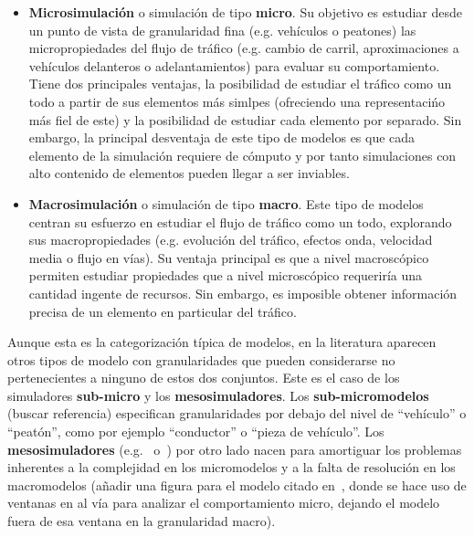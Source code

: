 \begin{itemize}
	\item \textbf{Microsimulación} o simulación de tipo \textbf{micro}. Su objetivo es estudiar desde un punto de vista de granularidad fina (e.g. vehículos o peatones) las micropropiedades del flujo de tráfico (e.g. cambio de carril, aproximaciones a vehículos delanteros o adelantamientos) para evaluar su comportamiento. Tiene dos principales ventajas, la posibilidad de estudiar el tráfico como un todo a partir de sus elementos más simlpes (ofreciendo una representacińo más fiel de este) y la posibilidad de estudiar cada elemento por separado. Sin embargo, la principal desventaja de este tipo de modelos es que cada elemento de la simulación requiere de cómputo y por tanto simulaciones con alto contenido de elementos pueden llegar a ser inviables.
	\item \textbf{Macrosimulación} o simulación de tipo \textbf{macro}. Este tipo de modelos centran su esfuerzo en estudiar el flujo de tráfico como un todo, explorando sus macropropiedades (e.g. evolución del tráfico, efectos onda, velocidad media o flujo en vías). Su ventaja principal es que a nivel macroscópico permiten estudiar propiedades que a nivel microscópico requeriría una cantidad ingente de recursos. Sin embargo, es imposible obtener información precisa de un elemento en particular del tráfico.
\end{itemize}


Aunque esta es la categorización típica de modelos, en la literatura aparecen otros tipos de modelo con granularidades que pueden considerarse no pertenecientes a ninguno de estos dos conjuntos. Este es el caso de los simuladores \textbf{sub-micro} y los \textbf{mesosimuladores}. Los \textbf{sub-micromodelos} (\TODO buscar referencia) especifican granularidades por debajo del nivel de \enquote{vehículo} o \enquote{peatón}, como por ejemplo \enquote{conductor} o \enquote{pieza de vehículo}. Los \textbf{mesosimuladores} (e.g.~\cite{munoz2001integrated} o~\cite{casas2011need}) por otro lado nacen para amortiguar los problemas inherentes a la complejidad en los micromodelos y a la falta de resolución en los macromodelos (\TODO añadir una figura para el modelo citado en~\cite{munoz2001integrated}, donde se hace uso de ventanas en al vía para analizar el comportamiento micro, dejando el modelo fuera de esa ventana en la granularidad macro).

